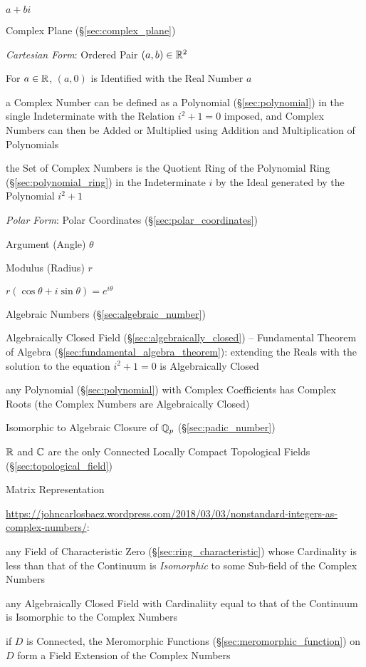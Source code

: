 $a + bi$

Complex Plane (\S\ref{sec:complex_plane})

\emph{Cartesian Form}: Ordered Pair $(a,b) \in \mathbb{R}^2$

For $a \in \mathbb{R}$, $(a,0)$ is Identified with the Real Number $a$

a Complex Number can be defined as a Polynomial (\S\ref{sec:polynomial}) in the
single Indeterminate with the Relation $i^2 + 1 = 0$ imposed, and Complex
Numbers can then be Added or Multiplied using Addition and Multiplication of
Polynomials

the Set of Complex Numbers is the Quotient Ring of the Polynomial Ring
(\S\ref{sec:polynomial_ring}) in the Indeterminate $i$ by the Ideal generated by
the Polynomial $i^2 + 1$

\emph{Polar Form}: Polar Coordinates (\S\ref{sec:polar_coordinates})

Argument (Angle) $\theta$

Modulus (Radius) $r$

$r(\cos\theta + i \sin\theta) = e^{i\theta}$

Algebraic Numbers (\S\ref{sec:algebraic_number})

Algebraically Closed Field (\S\ref{sec:algebraically_closed}) -- Fundamental
Theorem of Algebra (\S\ref{sec:fundamental_algebra_theorem}): extending the
Reals with the solution to the equation $i^2 + 1 = 0$ is Algebraically Closed

any Polynomial (\S\ref{sec:polynomial}) with Complex Coefficients has Complex
Roots (the Complex Numbers are Algebraically Closed)

Isomorphic to Algebraic Closure of $\mathbb{Q}_p$ (\S\ref{sec:padic_number})

$\mathbb{R}$ and $\mathbb{C}$ are the only Connected Locally Compact
Topological Fields (\S\ref{sec:topological_field})

Matrix Representation %

\url{https://johncarlosbaez.wordpress.com/2018/03/03/nonstandard-integers-as-complex-numbers/}:

any Field of Characteristic Zero (\S\ref{sec:ring_characteristic}) whose
Cardinality is less than that of the Continuum is \emph{Isomorphic} to some
Sub-field of the Complex Numbers

any Algebraically Closed Field with Cardinaliity equal to that of the Continuum
is Isomorphic to the Complex Numbers

if $D$ is Connected, the Meromorphic Functions
(\S\ref{sec:meromorphic_function}) on $D$ form a Field Extension of the Complex
Numbers



